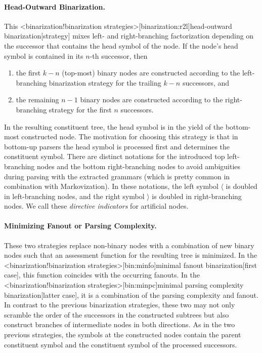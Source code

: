 \documentclass[../../document.tex]{subfiles}
\begin{document}
    \paragraph{Head-Outward Binarization.}
    This <binarization!binarization strategies>[binarization:r2l]{head-outward binarization}[strategy] mixes left- and right-branching factorization depending on the successor that contains the head symbol of the node.
    If the node's head symbol is contained in its \(n\)-th successor, then
    \begin{enumerate}
        \item the first \(k-n\) (top-most) binary nodes are constructed according to the left-branching binarization strategy for the trailing \(k-n\) successors, and
        \item the remaining \(n-1\) binary nodes are constructed according to the right-branching strategy for the first \(n\) successors.
    \end{enumerate}
    In the resulting constituent tree, the head symbol is in the yield of the bottom-most constructed node.
    The motivation for choosing this strategy is that in bottom-up parsers the head symbol is processed first and determines the constituent symbol.
    There are distinct notations for the introduced top left-branching nodes and the bottom right-branching nodes to avoid ambiguities during parsing with the extracted grammars (which is pretty common in combination with Markovization).
    In these notations, the left symbol \(\langle\) is doubled in left-branching nodes, and the right symbol \(\rangle\) is doubled in right-branching nodes.
    We call these \emph{directive indicators} for artificial nodes.

    \paragraph{Minimizing Fanout or Parsing Complexity.}
    These two strategies replace non-binary nodes with a combination of new binary nodes such that an assessment function for the resulting tree is minimized.
    In the <binarization!binarization strategies>[bin:minfo]{minimal fanout binarization}[first case], this function coincides with the occurring fanouts.
    In the <binarization!binarization strategies>[bin:minpc]{minimal parsing complexity binarization}[latter case], it is a combination of the parsing complexity and fanout.
    In contrast to the previous binarization strategies, these two may not only scramble the order of the successors in the constructed subtrees but also construct branches of intermediate nodes in both directions.
    As in the two previous strategies, the symbols at the constructed nodes contain the parent constituent symbol and the constituent symbol of the processed successors.
\end{document}
